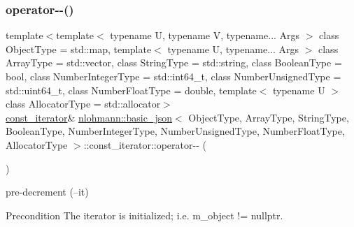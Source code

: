 \subsubsection{\texorpdfstring{operator-\/-\/()}{operator--()}\hspace{0.1cm}{\footnotesize\ttfamily [2/2]}}
{\footnotesize\ttfamily template$<$template$<$ typename U, typename V, typename... Args $>$ class Object\+Type = std\+::map, template$<$ typename U, typename... Args $>$ class Array\+Type = std\+::vector, class String\+Type  = std\+::string, class Boolean\+Type  = bool, class Number\+Integer\+Type  = std\+::int64\+\_\+t, class Number\+Unsigned\+Type  = std\+::uint64\+\_\+t, class Number\+Float\+Type  = double, template$<$ typename U $>$ class Allocator\+Type = std\+::allocator$>$ \\
\hyperlink{classnlohmann_1_1basic__json_1_1const__iterator}{const\+\_\+iterator}\& \hyperlink{classnlohmann_1_1basic__json}{nlohmann\+::basic\+\_\+json}$<$ Object\+Type, Array\+Type, String\+Type, Boolean\+Type, Number\+Integer\+Type, Number\+Unsigned\+Type, Number\+Float\+Type, Allocator\+Type $>$\+::const\+\_\+iterator\+::operator-\/-\/ (\begin{DoxyParamCaption}{ }\end{DoxyParamCaption})\hspace{0.3cm}{\ttfamily [inline]}}



pre-\/decrement (--it) 

\begin{DoxyPrecond}{Precondition}
The iterator is initialized; i.\+e. {\ttfamily m\+\_\+object != nullptr}. 
\end{DoxyPrecond}
\hypertarget{classnlohmann_1_1basic__json_1_1const__iterator_aefac8f3e390ac917f021761f4a8f8e71}{}\label{classnlohmann_1_1basic__json_1_1const__iterator_aefac8f3e390ac917f021761f4a8f8e71} 
